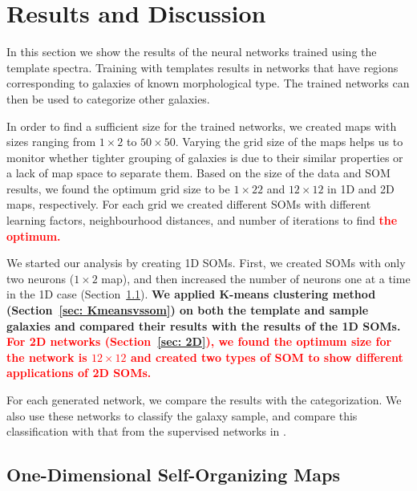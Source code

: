 \section{Results and Discussion}
\label{sec: result}

    In this section we show the results of the neural networks trained using the  template spectra.
    Training with  templates results in networks that have regions corresponding to galaxies of known morphological type. 
    The trained networks can then be used to categorize other galaxies.

    In order to find a sufficient size for the trained networks, we created maps with sizes ranging from $1\times2$ to $50\times50$.
    Varying the grid size of the maps helps us to monitor whether tighter grouping of galaxies is due to their similar properties or a lack of map space to separate them.
    Based on the size of the data and SOM results, we found the optimum grid size to be $1\times22$ and $12\times12$ in 1D and 2D maps, respectively. 
    For each grid we created different SOMs with different learning factors, neighbourhood distances, and number of iterations to find \textbf{\textcolor{red}{the optimum.}}
   
    We started our analysis by creating 1D SOMs. 
    First, we created SOMs with only two neurons ($1\times2$ map), and then increased the number of neurons one at a time in the 1D case (Section~\ref{sec: 1D_somz}).
    \textbf{We applied K-means clustering method (Section~\ref{sec: Kmeansvssom}) on both the template and sample galaxies and compared their results with the results of the 1D SOMs.}
    \textbf{\textcolor{red}{For 2D networks (Section~\ref{sec: 2D}), we found the optimum size for the network is $12\times12$ and created two types of SOM to show different applications of 2D SOMs.}}
    
    For each generated network, we compare the results with the  categorization.
    We also use these networks to classify the  galaxy sample, and compare this classification with that from the supervised networks in .

    \subsection{One-Dimensional Self-Organizing Maps}
    \label{sec: 1D_somz}
